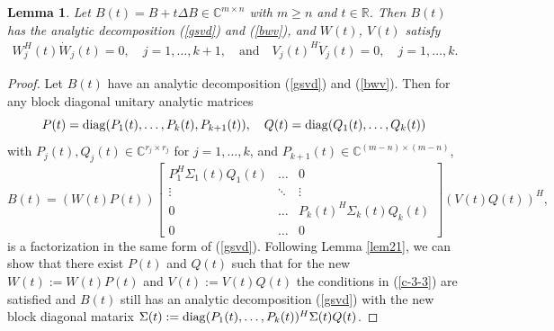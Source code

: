 \documentclass[11pt,a4paper]{article}
\numberwithin{equation}{section}
\newcommand {\mat} [1] {\left[\begin{array}{#1}}
\newcommand {\rix}     {\end{array}\right]}
\newtheorem{Lemma}{Lemma}[section]
\newcommand {\diag}  {\mathop{\rm diag}\nolimits}
\begin{document}
\medskip

\begin{Lemma}\label{lem32}
Let $B(t)=B+t\Delta B\in\mathbb{C}^{m\times n}$ with $m\geq n$ and $t\in\mathbb{R}$.
Then $B(t)$ has the analytic decomposition (\ref{gsvd}) and (\ref{bwv}), and $W(t)$, $V(t)$
satisfy
\begin{eqnarray}\label{c-3-3}
W_j^H(t)\dot{W}_j(t)=0,\quad j=1,\ldots,k+1,\quad\mbox{and}\quad V_j(t)^H\dot{V}_j(t)=0,
\quad j=1,\ldots,k.
\end{eqnarray}
\end{Lemma}

\medskip

\begin{proof} Let $B(t)$ have an analytic decomposition (\ref{gsvd}) and (\ref{bwv}).
Then for any block diagonal unitary analytic matrices
\[
P(t)=\diag(P_1(t),\dots, P_k(t),P_{k+1}(t)),\quad
Q(t)=\diag(Q_1(t),\ldots,Q_k(t))
\]
with $P_j(t),Q_j(t)\in{\mathbb C}^{r_j\times r_j}$ for $j=1,\ldots,k$, and
$P_{k+1}(t)\in{\mathbb C}^{(m-n)\times (m-n)}$,
\[
B(t)=(W(t)P(t))\mat{ccc}P_1^H\Sigma_1(t)Q_1(t)&\ldots&0\\\vdots&\ddots&\vdots\\
0&\ldots&P_k(t)^H\Sigma_k(t)Q_k(t)\\0&\ldots&0\rix (V(t)Q(t))^H,
\]
is a factorization in the same form of (\ref{gsvd}).  Following
Lemma \ref{lem21}, we can show that there exist $P(t)$ and $Q(t)$ such that
for the new $W(t):=W(t)P(t)$ and $V(t):=V(t)Q(t)$ the conditions in (\ref{c-3-3}) are satisfied and
$B(t)$ still has an analytic decomposition (\ref{gsvd}) with the new
block diagonal matarix $\Sigma(t):=\diag(P_1(t),\ldots,P_k(t))^H\Sigma(t)Q(t)$.
\end{proof}

\medskip
\end{document}
